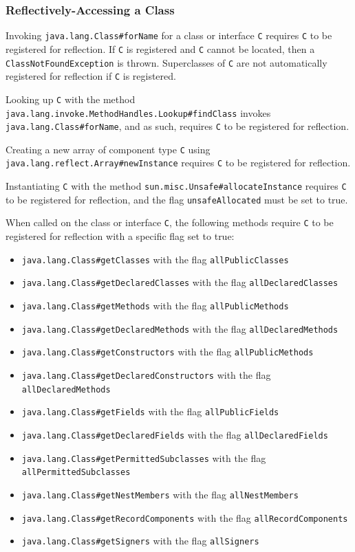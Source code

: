 \subsubsection{Reflectively-Accessing a Class}
Invoking \texttt{java.lang.Class\#forName} for a class or interface \verb|C| requires \verb|C| to be registered for reflection. If \verb|C| is registered and \verb|C| cannot be located, then a \texttt{ClassNotFoundException} is thrown. Superclasses of \verb|C| are not automatically registered for reflection if \verb|C| is registered.

Looking up \verb|C| with the method \texttt{java.lang.invoke.MethodHandles.Lookup\#findClass} invokes \texttt{java.lang.Class\#forName}, and as such, requires \verb|C| to be registered for reflection.

Creating a new array of component type \verb|C| using \texttt{java.lang.reflect.Array\#newInstance} requires \verb|C| to be registered for reflection.

Instantiating \verb|C| with the method \texttt{sun.misc.Unsafe\#allocateInstance} requires \verb|C| to be registered for reflection, and the flag \texttt{unsafeAllocated} must be set to true.

When called on the class or interface \verb|C|, the following methods require \verb|C| to be registered for reflection with a specific flag set to true:
\begin{itemize}
    \item \texttt{java.lang.Class\#getClasses} with the flag \texttt{allPublicClasses} 
    \item \texttt{java.lang.Class\#getDeclaredClasses} with the flag \texttt{allDeclaredClasses} 
    \item \texttt{java.lang.Class\#getMethods} with the flag \texttt{allPublicMethods} 
    \item \texttt{java.lang.Class\#getDeclaredMethods} with the flag \texttt{allDeclaredMethods} 
    \item \texttt{java.lang.Class\#getConstructors} with the flag \texttt{allPublicMethods} 
    \item \texttt{java.lang.Class\#getDeclaredConstructors} with the flag \texttt{allDeclaredMethods} 
    \item \texttt{java.lang.Class\#getFields} with the flag \texttt{allPublicFields} 
    \item \texttt{java.lang.Class\#getDeclaredFields} with the flag \texttt{allDeclaredFields} 
    \item \texttt{java.lang.Class\#getPermittedSubclasses} with the flag \texttt{allPermittedSubclasses} 
    \item \texttt{java.lang.Class\#getNestMembers} with the flag \texttt{allNestMembers} 
    \item \texttt{java.lang.Class\#getRecordComponents} with the flag \texttt{allRecordComponents} 
    \item \texttt{java.lang.Class\#getSigners} with the flag \texttt{allSigners}
\end{itemize}

